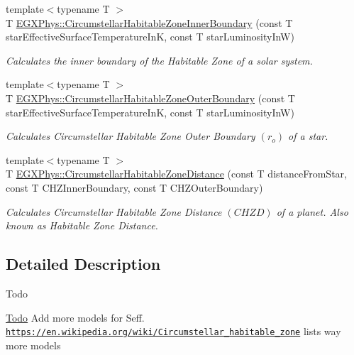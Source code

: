 \begin{DoxyCompactItemize}
{\footnotesize template$<$typename T $>$ }\\T \mbox{\hyperlink{group___e_g_x_phys-_circumstellar_habitable_zone_limit_gab31a33d0dbd3ecd00537832b5b836d73}{E\+G\+X\+Phys\+::\+Circumstellar\+Habitable\+Zone\+Inner\+Boundary}} (const T star\+Effective\+Surface\+Temperature\+InK, const T star\+Luminosity\+InW)
\begin{DoxyCompactList}\small\item\em Calculates the inner boundary of the Habitable Zone of a solar system. \end{DoxyCompactList}\item 
{\footnotesize template$<$typename T $>$ }\\T \mbox{\hyperlink{group___e_g_x_phys-_circumstellar_habitable_zone_limit_ga3a6dbbdaddddd071cb1f0a20e40d83bd}{E\+G\+X\+Phys\+::\+Circumstellar\+Habitable\+Zone\+Outer\+Boundary}} (const T star\+Effective\+Surface\+Temperature\+InK, const T star\+Luminosity\+InW)
\begin{DoxyCompactList}\small\item\em Calculates Circumstellar Habitable Zone Outer Boundary $(r_o)$ of a star. \end{DoxyCompactList}\item 
{\footnotesize template$<$typename T $>$ }\\T \mbox{\hyperlink{group___e_g_x_phys-_circumstellar_habitable_zone_limit_gaf289fb8f037ece66d850f7d827f83752}{E\+G\+X\+Phys\+::\+Circumstellar\+Habitable\+Zone\+Distance}} (const T distance\+From\+Star, const T C\+H\+Z\+Inner\+Boundary, const T C\+H\+Z\+Outer\+Boundary)
\begin{DoxyCompactList}\small\item\em Calculates Circumstellar Habitable Zone Distance $(CHZD)$ of a planet. Also known as Habitable Zone Distance. \end{DoxyCompactList}\end{DoxyCompactItemize}


\subsection{Detailed Description}
\begin{DoxyRefDesc}{Todo}
\item[\mbox{\hyperlink{todo__todo000003}{Todo}}]Add more models for Seff. \href{https://en.wikipedia.org/wiki/Circumstellar_habitable_zone}{\tt https\+://en.\+wikipedia.\+org/wiki/\+Circumstellar\+\_\+habitable\+\_\+zone} lists way more models \end{DoxyRefDesc}


